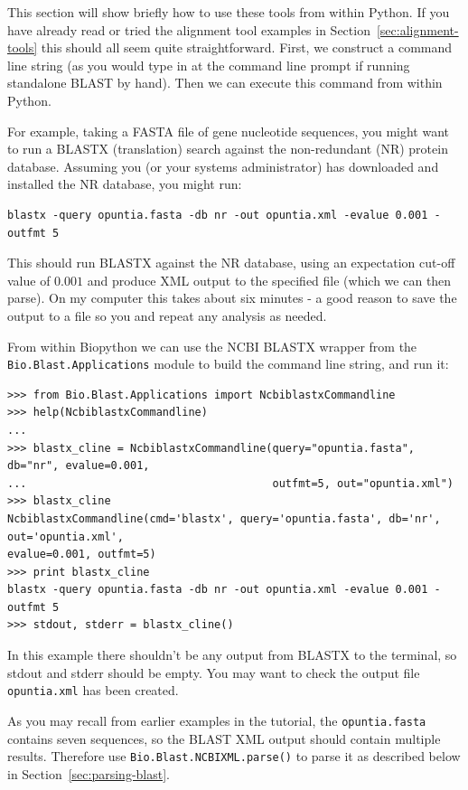 \documentclass{report}
\begin{document}
This section will show briefly how to use these tools from within Python. If you have
already read or tried the alignment tool examples in Section~\ref{sec:alignment-tools}
this should all seem quite straightforward. First, we construct a command line string
(as you would type in at the command line prompt if running standalone BLAST by hand).
Then we can execute this command from within Python.

For example, taking a FASTA file of gene nucleotide sequences, you might want to
run a BLASTX (translation) search against the non-redundant (NR) protein database.
Assuming you (or your systems administrator) has downloaded and installed the NR
database, you might run:

\begin{verbatim}
blastx -query opuntia.fasta -db nr -out opuntia.xml -evalue 0.001 -outfmt 5
\end{verbatim}

This should run BLASTX against the NR database, using an expectation cut-off value
of $0.001$ and produce XML output to the specified file (which we can then parse).
On my computer this takes about six minutes - a good reason to save the output
to a file so you and repeat any analysis as needed.

From within Biopython we can use the NCBI BLASTX wrapper from the
\verb|Bio.Blast.Applications| module to build the command line string,
and run it:

\begin{verbatim}
>>> from Bio.Blast.Applications import NcbiblastxCommandline
>>> help(NcbiblastxCommandline)
...
>>> blastx_cline = NcbiblastxCommandline(query="opuntia.fasta", db="nr", evalue=0.001,
...                                      outfmt=5, out="opuntia.xml")
>>> blastx_cline
NcbiblastxCommandline(cmd='blastx', query='opuntia.fasta', db='nr', out='opuntia.xml',
evalue=0.001, outfmt=5)
>>> print blastx_cline
blastx -query opuntia.fasta -db nr -out opuntia.xml -evalue 0.001 -outfmt 5
>>> stdout, stderr = blastx_cline()
\end{verbatim}

In this example there shouldn't be any output from BLASTX to the terminal,
so stdout and stderr should be empty. You may want to check the output file
\verb|opuntia.xml| has been created.

As you may recall from earlier examples in the tutorial, the \verb|opuntia.fasta|
contains seven sequences, so the BLAST XML output should contain multiple results.
Therefore use \verb|Bio.Blast.NCBIXML.parse()| to parse it as described below in
Section~\ref{sec:parsing-blast}.
\end{document}
